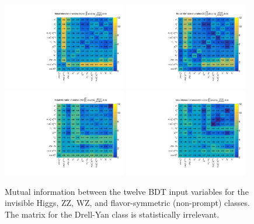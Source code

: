 \begin{figure}[htbp]
\begin{center}
\includegraphics[width=0.48\textwidth]{figures/mutual_information_MVAvars_Signal.pdf}
\includegraphics[width=0.48\textwidth]{figures/mutual_information_MVAvars_ZZ.pdf}
\includegraphics[width=0.48\textwidth]{figures/mutual_information_MVAvars_WZ.pdf}
\includegraphics[width=0.48\textwidth]{figures/mutual_information_MVAvars_Non-prompt.pdf}
\caption{Mutual information between the twelve BDT input variables for the invisible Higgs, ZZ, WZ, and flavor-symmetric (non-prompt) classes. The matrix for the Drell-Yan class is statistically irrelevant.}
\label{fig:bdt_mutual_information}
\end{center}
\end{figure}

